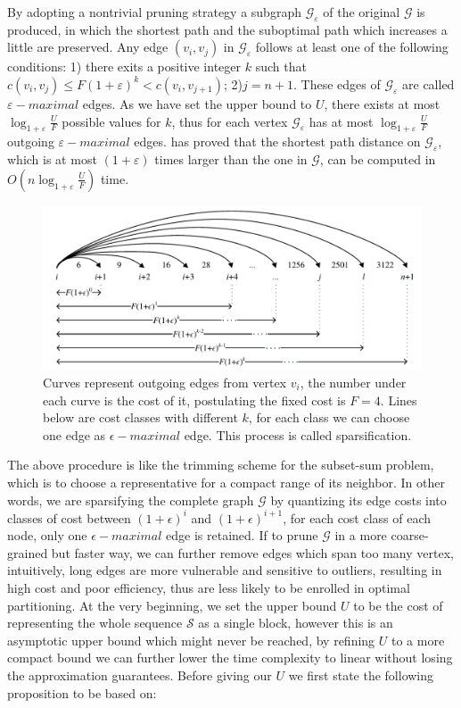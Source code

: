 \documentclass[runningheads,a4paper]{llncs}
\begin{document}
By adopting a nontrivial pruning strategy a subgraph $\mathcal{G_{\varepsilon}}$ of the original $\mathcal{G}$ is produced, in which the shortest path and the suboptimal path which increases a little are preserved. Any edge $\left(v_{i},v_{j}\right)$ in $\mathcal{G_{\varepsilon}}$ follows at least one of the following conditions: 1) there exits a positive integer $k$ such that $c\left(v_{i},v_{j}\right) \leqslant F\left(1+\varepsilon\right)^{k} < c\left(v_{i},v_{j+1}\right)$\label{itm:property1}; 2)$j=n+1$. These edges of $\mathcal{G}_{\varepsilon}$ are called $ \varepsilon-maximal$ edges. As we have set the upper bound to $U$, there exists at most $\log_{1+\varepsilon}\frac{U}{F}$ possible values for $k$, thus for each vertex $\mathcal{G}_{\varepsilon}$ has at most $\log_{1+\varepsilon}\frac{U}{F}$ outgoing  $ \varepsilon-maximal$ edges. \cite{ferragina2011optimally} has proved that the shortest path distance on $\mathcal{G}_{\varepsilon}$, which is at most $\left(1+\varepsilon\right)$ times larger than the one in $\mathcal{G}$, can be computed in $O\left(n\log_{1+\varepsilon}\frac{U}{F}\right)$ time.

\begin{figure}
	\centering
	\includegraphics[width=0.7\linewidth]{sparsification}
	\caption[sparsification]{Curves represent outgoing edges from vertex $v_{i}$, the number under each curve is the cost of it, postulating the fixed cost is $F=4$. Lines below are cost classes with different $k$, for each class we can choose one edge as $\epsilon-maximal$ edge. This process is called sparsification.}
	\label{fig:sparsification}
\end{figure}

The above procedure is like the trimming scheme for the subset-sum problem\cite{cormen2009introduction}, which is to choose a representative for a compact range of its neighbor. In other words, we are sparsifying the complete graph $\mathcal{G}$ by quantizing its edge costs into classes of cost between $\left(1+\epsilon\right)^{i}$ and $\left(1+\epsilon\right)^{i+1}$, for each cost class of each node, only one $\epsilon-maximal$ edge is retained. If to prune $\mathcal{G}$ in a more coarse-grained but faster way, we can further remove edges which span too many vertex, intuitively, long edges are more vulnerable and sensitive to outliers, resulting in high cost and poor efficiency, thus are less likely to be enrolled in optimal partitioning. At the very beginning, we set the upper bound $U$ to be the cost of representing the whole sequence $\mathcal{S}$ as a single block, however this is an asymptotic upper bound which might never be reached, by refining $U$ to a more compact bound we can further lower the time complexity to linear without losing the approximation guarantees. Before giving our $U$ we first state the following proposition to be based on:
\end{document}
